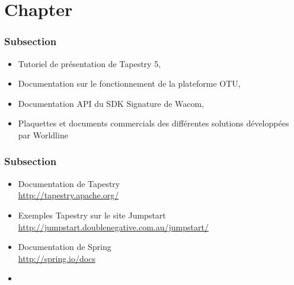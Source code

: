 \chapter*{Chapter}

\subsection*{Subsection}

\begin{itemize}
	\item Tutoriel de présentation de Tapestry 5,
	\item Documentation sur le fonctionnement de la plateforme OTU,
	\item Documentation API du SDK Signature de Wacom,
	\item Plaquettes et documents commercials des différentes solutions développées par Worldline
\end{itemize}

\subsection*{Subsection}

\begin{itemize}
 	\item Documentation de Tapestry\\
		\url{http://tapestry.apache.org/}
	\item Exemples Tapestry sur le site Jumpstart
		\url{http://jumpstart.doublenegative.com.au/jumpstart/}
	\item Documentation de Spring\\
		\url{http://spring.io/docs}
	\item 
\end{itemize}
